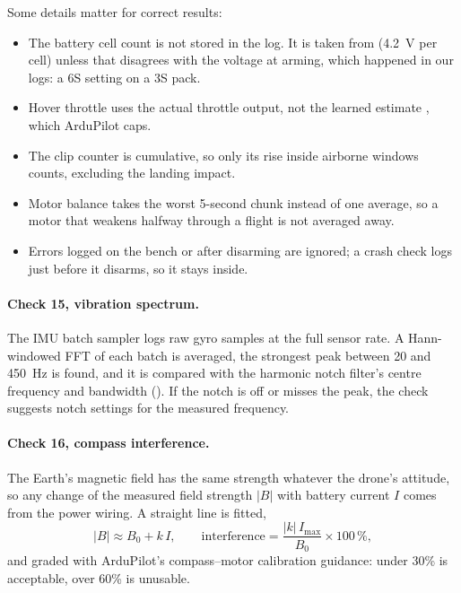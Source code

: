 \documentclass[11pt,a4paper]{article}
\newcommand{\code}[1]{\texttt{\detokenize{#1}}}
\begin{document}
Some details matter for correct results:
\begin{itemize}
  \item The battery cell count is not stored in the log. It is taken from \code{MOT_BAT_VOLT_MAX} (4.2~V per cell)
        unless that disagrees with the voltage at arming, which happened in our logs: a 6S setting on a 3S pack.
  \item Hover throttle uses the actual throttle output, not the learned estimate \code{ThH}, which ArduPilot caps.
  \item The clip counter is cumulative, so only its rise inside airborne windows counts, excluding the landing impact.
  \item Motor balance takes the worst 5-second chunk instead of one average, so a motor that weakens halfway
        through a flight is not averaged away.
  \item Errors logged on the bench or after disarming are ignored; a crash check logs just before it disarms, so it
        stays inside.
\end{itemize}

\paragraph{Check 15, vibration spectrum.} The IMU batch sampler logs raw gyro samples at the full sensor rate. A
Hann-windowed FFT of each batch is averaged, the strongest peak between 20 and 450~Hz is found, and it is compared
with the harmonic notch filter's centre frequency and bandwidth (\code{INS_HNTCH_*}). If the notch is off or misses
the peak, the check suggests notch settings for the measured frequency.

\paragraph{Check 16, compass interference.} The Earth's magnetic field has the same strength whatever the drone's
attitude, so any change of the measured field strength $|B|$ with battery current $I$ comes from the power wiring.
A straight line is fitted,
\begin{equation}
  |B| \approx B_0 + k\,I, \qquad \text{interference} = \frac{|k|\, I_{\max}}{B_0} \times 100\,\%,
\end{equation}
and graded with ArduPilot's compass--motor calibration guidance: under 30\% is acceptable, over 60\% is unusable.
\end{document}
